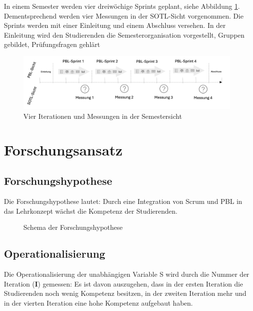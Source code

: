 \documentclass[a4paper,12pt]{article}
\begin{document}
\clearpage

In einem Semester werden vier dreiwöchige Sprints geplant, siehe Abbildung \ref{fig:semester}. Dementsprechend werden vier Messungen in der SOTL-Sicht vorgenommen. Die Sprints werden mit einer Einleitung und einem Abschluss versehen. In der Einleitung wird den Studierenden die Semesterorganisation vorgestellt, Gruppen gebildet, Prüfungsfragen gehlärt 


\begin{figure}[ht]
    \centering
    \includegraphics[width=1\textwidth]{images/semester.png}
    \caption{Vier Iterationen und Messungen in der Semestersicht}
    \label{fig:semester}
\end{figure}



\section{Forschungsansatz}
\subsection{Forschungshypothese}
Die Forschungshypothese lautet: Durch eine Integration von Scrum und PBL in das Lehrkonzept wächst die Kompetenz der Studierenden.

\begin{figure}[ht]
\begin{center}
    \caption{Schema der Forschungshypothese}
\end{center}
\end{figure}

\subsection{Operationalisierung}
Die Operationalisierung der unabhängigen Variable S wird durch die Nummer der Iteration (\textbf{I}) gemessen: Es ist davon auszugehen, dass in der ersten Iteration die Studierenden noch wenig Kompetenz besitzen, in der zweiten Iteration mehr und in der vierten Iteration eine hohe Kompetenz aufgebaut haben.
\end{document}
